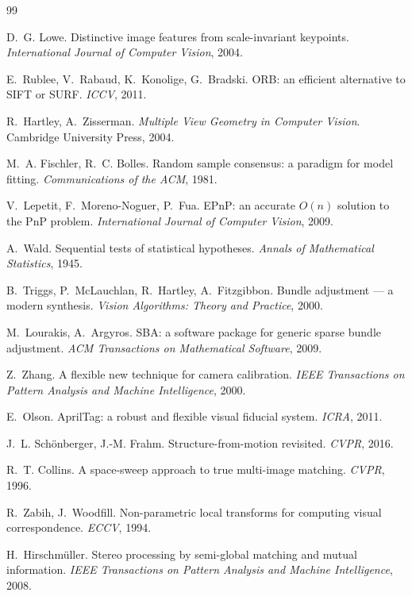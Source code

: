 \documentclass[11pt,a4paper]{article}
\begin{document}
\begin{thebibliography}{99}

 D.~G. Lowe. Distinctive image features from scale-invariant keypoints.
\emph{International Journal of Computer Vision}, 2004.

 E.~Rublee, V.~Rabaud, K.~Konolige, G.~Bradski. ORB: an efficient
alternative to SIFT or SURF. \emph{ICCV}, 2011.

 R.~Hartley, A.~Zisserman. \emph{Multiple View Geometry in Computer
Vision}. Cambridge University Press, 2004.

 M.~A. Fischler, R.~C. Bolles. Random sample consensus: a paradigm for
model fitting. \emph{Communications of the ACM}, 1981.

 V.~Lepetit, F.~Moreno-Noguer, P.~Fua. EPnP: an accurate $O(n)$ solution
to the PnP problem. \emph{International Journal of Computer Vision}, 2009.

 A.~Wald. Sequential tests of statistical hypotheses. \emph{Annals of
Mathematical Statistics}, 1945.

 B.~Triggs, P.~McLauchlan, R.~Hartley, A.~Fitzgibbon. Bundle adjustment ---
a modern synthesis. \emph{Vision Algorithms: Theory and Practice}, 2000.

 M.~Lourakis, A.~Argyros. SBA: a software package for generic sparse
bundle adjustment. \emph{ACM Transactions on Mathematical Software}, 2009.

 Z.~Zhang. A flexible new technique for camera calibration. \emph{IEEE
Transactions on Pattern Analysis and Machine Intelligence}, 2000.

 E.~Olson. AprilTag: a robust and flexible visual fiducial system.
\emph{ICRA}, 2011.

 J.~L. Sch\"onberger, J.-M. Frahm. Structure-from-motion revisited.
\emph{CVPR}, 2016.

 R.~T. Collins. A space-sweep approach to true multi-image matching.
\emph{CVPR}, 1996.

 R.~Zabih, J.~Woodfill. Non-parametric local transforms for computing visual
correspondence. \emph{ECCV}, 1994.

 H.~Hirschm\"uller. Stereo processing by semi-global matching and
mutual information. \emph{IEEE Transactions on Pattern Analysis and Machine Intelligence}, 2008.


\end{thebibliography}
\end{document}
